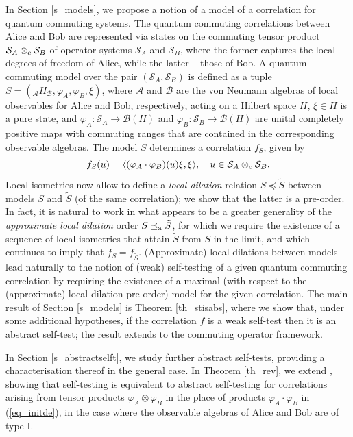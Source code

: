 \documentclass[11pt]{amsart}
\theoremstyle{definition}
\newcommand\nph{\varphi}
\newcommand{\cl}[1]{\mathcal{#1}}
\begin{document}
In Section \ref{s_models}, we propose a notion of a model 
of a correlation for quantum commuting systems. 
The quantum commuting correlations between Alice and Bob are represented 
via states on the commuting tensor product $\cl S_A\otimes_{\rm c} \cl S_B$ of
operator systems $\cl S_A$ and $\cl S_B$, where the former captures 
the local degrees of freedom of Alice, while the latter -- those of Bob. 
A quantum commuting model over the pair $(\cl S_A,\cl S_B)$
is defined as a tuple
$S=(_{\cl A}H_{\cl B},\varphi_A, \varphi_B, \xi)$, 
where $\cl A$ and $\cl B$ are the von Neumann algebras of local observables 
for Alice and Bob, respectively, acting on a Hilbert space $H$,
$\xi\in H$ is a pure state, and
$\varphi_A : \cl S_A\to \cl B(H)$ and $\varphi_B : \cl S_B\to \cl B(H)$
are unital completely positive maps with commuting ranges that are contained in 
the corresponding observable algebras. 
The model $S$ determines a correlation $f_S$, given by 
\begin{equation}\label{eq_initde}
f_S(u) = \langle (\nph_A\cdot\nph_B)(u)\xi,\xi\rangle, \ \ \ 
u\in \cl S_A\otimes_{\rm c} \cl S_B.
\end{equation}
Local isometries now allow to define a \emph{local dilation} relation 
$S\preceq \tilde{S}$ between models $S$ and $\tilde{S}$
(of the same correlation); we show that the latter is a pre-order. 
In fact, it is natural to work in what appears to be a greater generality
of the \emph{approximate local dilation} order $S\preceq_{\rm a} \tilde{S}$,
for which we require the existence of a sequence of local isometries that 
attain $\tilde{S}$ from $S$ in the limit, and 
which continues to imply that $f_S = f_{\tilde{S}}$. 
(Approximate) local dilations between models lead
naturally to the notion of (weak) self-testing of a given 
quantum commuting correlation by requiring 
the existence of a maximal (with respect to the
(approximate) local dilation pre-order) model for the given correlation.
The main result of Section \ref{s_models} is Theorem \ref{th_stisabs}, where we 
show that, under some additional hypotheses, if the correlation $f$ is a 
weak self-test then it is an abstract self-test; 
the result extends \cite[Proposition 4.10]{pszz} to the commuting operator framework. 

In Section \ref{s_abstractselft}, we study further abstract self-tests, 
providing a characterisation thereof in the general case. 
In Theorem \ref{th_rev}, we extend \cite[Theorem 3.5]{pszz}, 
showing that self-testing is equivalent to abstract self-testing 
for correlations arising from tensor products $\nph_A\otimes\nph_B$
in the place of products $\nph_A\cdot\nph_B$ in (\ref{eq_initde}), 
in the case where the observable algebras of Alice and Bob are of type I. 
\end{document}
